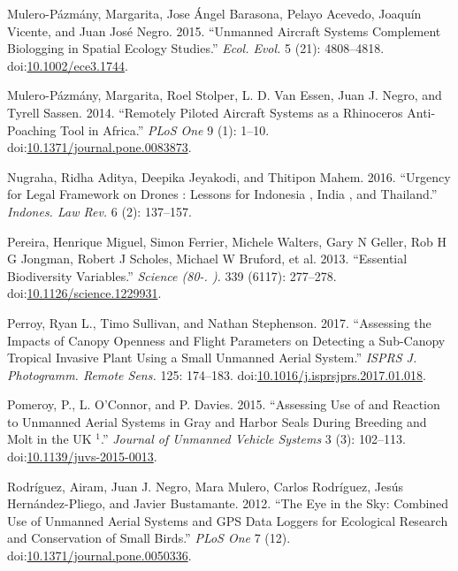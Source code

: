 \documentclass[]{interact}
\theoremstyle{plain}%
\theoremstyle{definition}
\theoremstyle{remark}
\begin{document}
\hypertarget{ref-mulero-pazmany_unmanned_2015}{}
Mulero-Pázmány, Margarita, Jose Ángel Barasona, Pelayo Acevedo, Joaquín
Vicente, and Juan José Negro. 2015. ``Unmanned Aircraft Systems
Complement Biologging in Spatial Ecology Studies.'' \emph{Ecol. Evol.} 5
(21): 4808--4818.
doi:\href{https://doi.org/10.1002/ece3.1744}{10.1002/ece3.1744}.

\hypertarget{ref-mulero-pazmany_remotely_2014}{}
Mulero-Pázmány, Margarita, Roel Stolper, L. D. Van Essen, Juan J. Negro,
and Tyrell Sassen. 2014. ``Remotely Piloted Aircraft Systems as a
Rhinoceros Anti-Poaching Tool in Africa.'' \emph{PLoS One} 9 (1): 1--10.
doi:\href{https://doi.org/10.1371/journal.pone.0083873}{10.1371/journal.pone.0083873}.

\hypertarget{ref-nugraha_urgency_2016}{}
Nugraha, Ridha Aditya, Deepika Jeyakodi, and Thitipon Mahem. 2016.
``Urgency for Legal Framework on Drones : Lessons for Indonesia , India
, and Thailand.'' \emph{Indones. Law Rev.} 6 (2): 137--157.

\hypertarget{ref-pereira_essential_2013}{}
Pereira, Henrique Miguel, Simon Ferrier, Michele Walters, Gary N Geller,
Rob H G Jongman, Robert J Scholes, Michael W Bruford, et al. 2013.
``Essential Biodiversity Variables.'' \emph{Science (80-. ).} 339
(6117): 277--278.
doi:\href{https://doi.org/10.1126/science.1229931}{10.1126/science.1229931}.

\hypertarget{ref-perroy_assessing_2017}{}
Perroy, Ryan L., Timo Sullivan, and Nathan Stephenson. 2017. ``Assessing
the Impacts of Canopy Openness and Flight Parameters on Detecting a
Sub-Canopy Tropical Invasive Plant Using a Small Unmanned Aerial
System.'' \emph{ISPRS J. Photogramm. Remote Sens.} 125: 174--183.
doi:\href{https://doi.org/10.1016/j.isprsjprs.2017.01.018}{10.1016/j.isprsjprs.2017.01.018}.

\hypertarget{ref-pomeroy_assessing_2015}{}
Pomeroy, P., L. O'Connor, and P. Davies. 2015. ``Assessing Use of and
Reaction to Unmanned Aerial Systems in Gray and Harbor Seals During
Breeding and Molt in the UK \(^{\textrm{1}}\).'' \emph{Journal of
Unmanned Vehicle Systems} 3 (3): 102--113.
doi:\href{https://doi.org/10.1139/juvs-2015-0013}{10.1139/juvs-2015-0013}.

\hypertarget{ref-rodriguez_eye_2012}{}
Rodríguez, Airam, Juan J. Negro, Mara Mulero, Carlos Rodríguez, Jesús
Hernández-Pliego, and Javier Bustamante. 2012. ``The Eye in the Sky:
Combined Use of Unmanned Aerial Systems and GPS Data Loggers for
Ecological Research and Conservation of Small Birds.'' \emph{PLoS One} 7
(12).
doi:\href{https://doi.org/10.1371/journal.pone.0050336}{10.1371/journal.pone.0050336}.
\end{document}
